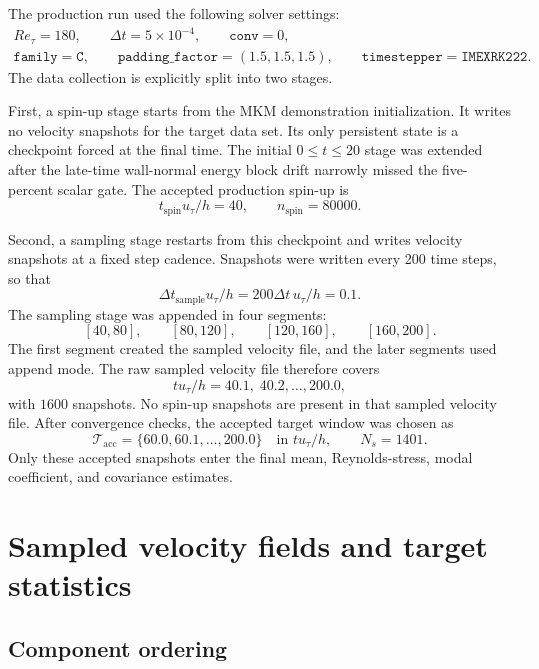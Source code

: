 \documentclass[11pt]{article}
\begin{document}
The production run used the following solver settings:
\[
\begin{gathered}
  Re_{\tau}=180,\qquad \Delta t=5\times 10^{-4},\qquad
  \texttt{conv}=0,\\
  \texttt{family}=\texttt{C},\qquad
  \texttt{padding\_factor}=(1.5,1.5,1.5),\qquad
  \texttt{timestepper}=\texttt{IMEXRK222}.
\end{gathered}
\]
The data collection is explicitly split into two stages.

First, a spin-up stage starts from the MKM demonstration initialization. It
writes no velocity snapshots for the target data set. Its only persistent
state is a checkpoint forced at the final time. The initial \(0\le t\le20\)
stage was extended after the late-time wall-normal energy block drift narrowly
missed the five-percent scalar gate. The accepted production spin-up is
\[
  t_{\mathrm{spin}}u_{\tau}/h = 40,\qquad n_{\mathrm{spin}}=80000.
\]

Second, a sampling stage restarts from this checkpoint and writes velocity
snapshots at a fixed step cadence. Snapshots were written every
200 time steps, so that
\[
  \Delta t_{\mathrm{sample}} u_{\tau}/h = 200\Delta t\,u_{\tau}/h = 0.1.
\]
The sampling stage was appended in four segments:
\[
  [40,80],\qquad [80,120],\qquad [120,160],\qquad [160,200].
\]
The first segment created the sampled velocity file, and the later segments
used append mode. The raw sampled velocity file therefore covers
\[
  t u_{\tau}/h=40.1,\;40.2,\ldots,200.0,
\]
with \(1600\) snapshots. No spin-up snapshots are present in that sampled
velocity file. After convergence checks, the accepted target window was chosen
as
\begin{equation}
  \mathcal{T}_{\mathrm{acc}} = \{60.0,60.1,\ldots,200.0\}
  \quad\text{in }t u_{\tau}/h,
  \qquad N_s=1401.
  \label{eq:accepted_sample_times}
\end{equation}
Only these accepted snapshots enter the final mean, Reynolds-stress, modal
coefficient, and covariance estimates.

\section{Sampled velocity fields and target statistics}
\label{sec:sampled_outputs}

\subsection{Component ordering}
\end{document}
